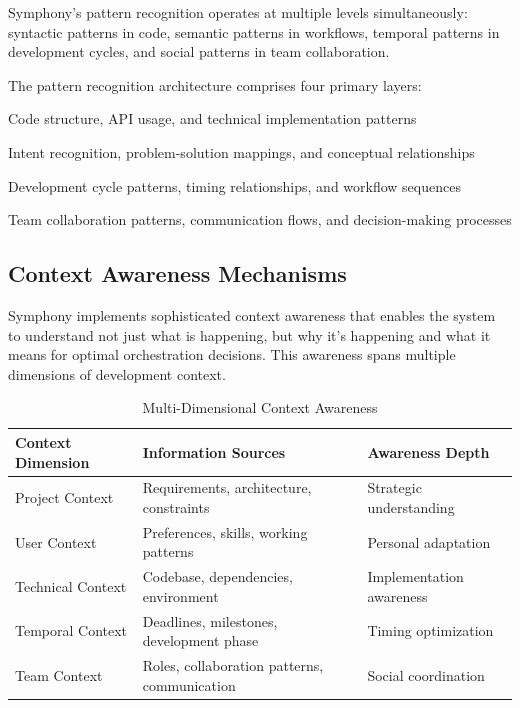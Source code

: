 \begin{infobox}[title=Hierarchical Pattern Learning]
Symphony's pattern recognition operates at multiple levels simultaneously: syntactic patterns in code, semantic patterns in workflows, temporal patterns in development cycles, and social patterns in team collaboration.
\end{infobox}

The pattern recognition architecture comprises four primary layers:

\begin{description}[leftmargin=4cm,labelwidth=3.5cm]
    \item[\textbf{Syntactic Layer}] Code structure, API usage, and technical implementation patterns
    \item[\textbf{Semantic Layer}] Intent recognition, problem-solution mappings, and conceptual relationships
    \item[\textbf{Temporal Layer}] Development cycle patterns, timing relationships, and workflow sequences
    \item[\textbf{Social Layer}] Team collaboration patterns, communication flows, and decision-making processes
\end{description}

\subsection*{Context Awareness Mechanisms}

Symphony implements sophisticated context awareness that enables the system to understand not just what is happening, but why it's happening and what it means for optimal orchestration decisions. This awareness spans multiple dimensions of development context.

\begin{table}[ht]
\centering
\begin{tabular}{@{}lll@{}}
\toprule
\textbf{Context Dimension} & \textbf{Information Sources} & \textbf{Awareness Depth} \\
\midrule
Project Context & Requirements, architecture, constraints & Strategic understanding \\
User Context & Preferences, skills, working patterns & Personal adaptation \\
Technical Context & Codebase, dependencies, environment & Implementation awareness \\
Temporal Context & Deadlines, milestones, development phase & Timing optimization \\
Team Context & Roles, collaboration patterns, communication & Social coordination \\
\bottomrule
\end{tabular}
\caption{Multi-Dimensional Context Awareness}
\end{table}

